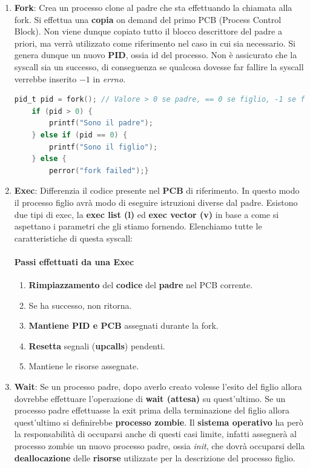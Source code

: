 \documentclass{article}
\begin{document}
\begin{enumerate}
    \item \textbf{Fork}: Crea un processo clone al padre che sta effettuando la chiamata alla fork. Si effettua una \textbf{copia}
    on demand del primo PCB (Process Control Block). Non viene dunque copiato tutto il blocco descrittore del padre a priori, ma verrà utilizzato
    come riferimento nel caso in cui sia necessario. Si genera dunque un nuovo \textbf{PID}, ossia id del processo. Non è assicurato che la syscall sia un 
    successo, di conseguenza se qualcosa dovesse far fallire la syscall verrebbe inserito $-1$ in \textit{errno}.

    \vspace*{10px}
\begin{lstlisting}[language = C]
    pid_t pid = fork(); // Valore > 0 se padre, == 0 se figlio, -1 se fallisce, in modo da distinguere facilmente i processi
    if (pid > 0) {
        printf("Sono il padre");
    } else if (pid == 0) {
        printf("Sono il figlio");
    } else {
        perror("fork failed");}
    \end{lstlisting}    

    \item \textbf{Exec}: Differenzia il codice presente nel \textbf{PCB} di riferimento. In questo modo il processo figlio avrà modo di eseguire
    istruzioni diverse dal padre. Esistono due tipi di exec, la \textbf{exec list (l)} ed \textbf{exec vector (v)} in base a come si aspettano i parametri
    che gli stiamo fornendo. Elenchiamo tutte le caratteristiche di questa syscall:
    \paragraph{Passi effettuati da una Exec}
    \begin{enumerate}
        \item \textbf{Rimpiazzamento} del \textbf{codice} del \textbf{padre} nel PCB corrente.
        \item Se ha successo, non ritorna.
        \item \textbf{Mantiene PID e PCB} assegnati durante la fork.
        \item \textbf{Resetta} segnali (\textbf{upcalls}) pendenti.
        \item Mantiene le risorse assegnate.
    \end{enumerate}

    
\newpage

\item \textbf{Wait}: Se un processo padre, dopo averlo creato volesse l'esito del figlio allora dovrebbe effettuare l'operazione di \textbf{wait (attesa)}
su quest'ultimo. Se un processo padre effettuasse la exit prima della terminazione del figlio allora quest'ultimo si definirebbe
\textbf{processo zombie}. Il \textbf{sistema operativo} ha però la responsabilità di occuparsi anche di questi casi limite, infatti assegnerà al processo zombie
un nuovo processo padre, ossia \textit{init}, che dovrà occuparsi della \textbf{deallocazione} delle \textbf{risorse} utilizzate per la descrizione
del processo figlio.


\end{enumerate}
\end{document}
